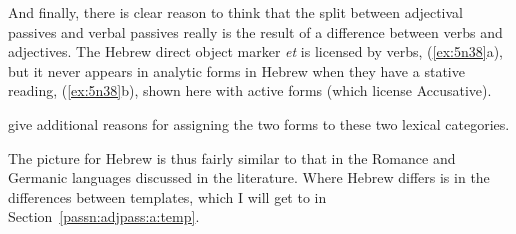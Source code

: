 \begin{exe}
\begin{xlist}
\begin{exe}
\begin{xlist}
\begin{exe}
\begin{exe}
\begin{xlist}
\begin{exe}
\begin{exe}
\begin{xlist}
\begin{exe}
\begin{xlist}
\begin{exe}
\begin{xlist}
\begin{exe}
\begin{xlist}
\begin{xlist}
\begin{exe}
\begin{xlist}
\begin{exe}
\begin{xlist}
\begin{exe}
\begin{exe}
\begin{exe}
\begin{xlist}
\begin{exe}
\begin{exe}
\begin{xlist}
\begin{exe}
\begin{xlist}
\begin{exe}
\begin{xlist}
\begin{exe}
\begin{xlist}
\begin{xlist}
\begin{exe}
\begin{xlist}
\begin{exe}
\begin{xlist}
\begin{exe}
\begin{xlist}
And finally, there is clear reason to think that the split between adjectival passives and verbal passives really is the result of a difference between verbs and adjectives. The Hebrew direct object marker \emph{et} is licensed by verbs, (\ref{ex:5n38}a), but it never appears in analytic forms in Hebrew when they have a stative reading, (\ref{ex:5n38}b), shown here with active forms (which license Accusative). 
 \begin{exe}
 \ex  \label{ex:5n38}
 \begin{xlist} 
			
		
 \z
\z 
\cite{horvathsiloni08} give additional reasons for assigning the two forms to these two lexical categories.

The picture for Hebrew is thus fairly similar to that in the Romance and Germanic languages discussed in the literature. Where Hebrew differs is in the differences between templates, which I will get to in Section~\ref{passn:adjpass:a:temp}.


\end{xlist}
\end{exe}
\end{xlist}
\end{exe}
\end{xlist}
\end{exe}
\end{xlist}
\end{exe}
\end{xlist}
\end{xlist}
\end{exe}
\end{xlist}
\end{exe}
\end{xlist}
\end{exe}
\end{xlist}
\end{exe}
\end{exe}
\end{xlist}
\end{exe}
\end{exe}
\end{exe}
\end{xlist}
\end{exe}
\end{xlist}
\end{exe}
\end{xlist}
\end{xlist}
\end{exe}
\end{xlist}
\end{exe}
\end{xlist}
\end{exe}
\end{xlist}
\end{exe}
\end{exe}
\end{xlist}
\end{exe}
\end{exe}
\end{xlist}
\end{exe}
\end{xlist}
\end{exe}
